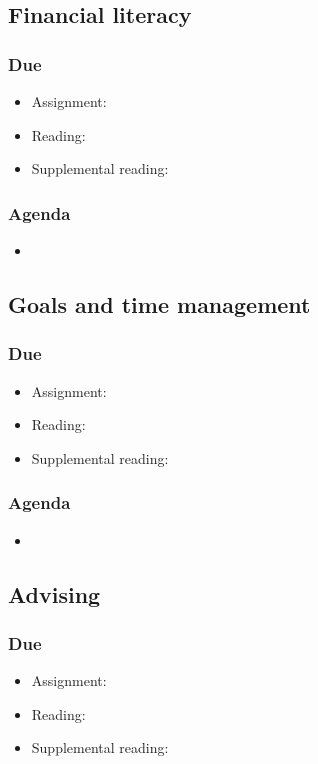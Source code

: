 \documentclass[12pt,article,oneside]{memoir}
\begin{document}
\subsection{Financial literacy}
\subsubsection{Due}
\begin{itemize}
 \item Assignment: 
 \item Reading: \cite{finra}
 \item Supplemental reading:
\end{itemize}

\subsubsection{Agenda}
\begin{itemize}
\item 
\end{itemize}



\subsection{Goals and time management}
\subsubsection{Due}
\begin{itemize}
 \item Assignment: 
 \item Reading:
 \item Supplemental reading:
\end{itemize}

\subsubsection{Agenda}
\begin{itemize}
\item 
\end{itemize}

\subsection{Advising}
\subsubsection{Due}
\begin{itemize}
 \item Assignment: 
 \item Reading:
 \item Supplemental reading:
\end{itemize}
\end{document}
